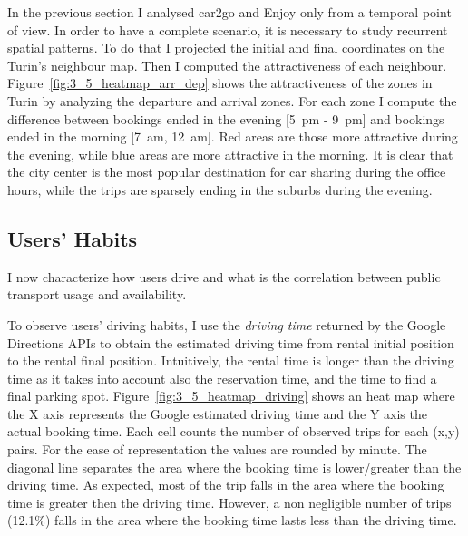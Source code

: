 In the previous section I analysed car2go and Enjoy only from a temporal point of view. In order to have a complete scenario, it is necessary to study recurrent spatial patterns. To do that I projected the initial and final coordinates on the Turin's neighbour map. Then I computed the attractiveness of each neighbour. Figure~\ref{fig:3_5_heatmap_arr_dep} shows the attractiveness of the  zones in Turin by analyzing the departure and arrival zones. For each zone I compute the difference between bookings ended in the evening [5~pm - 9~pm] and bookings ended in the morning [7~am, 12~am]. Red {areas are those} more attractive during the evening, while blue areas are more attractive in the morning. It is clear that the city center is the most popular destination for car sharing during the office hours, while the trips are sparsely ending in the suburbs during the evening.


\subsection{Users' Habits}

I now characterize how users drive and what is the correlation between public transport usage and availability.

To observe users' driving habits, I use the \textit{driving time} returned by the Google Directions APIs to {obtain} the estimated {driving} time from {rental initial position to the rental final position}. Intuitively, the {rental} time is longer than the driving time as it takes into account also the {reservation} time, and the time to find a final parking spot. Figure~\ref{fig:3_5_heatmap_driving} shows an heat map where the X axis represents the Google estimated driving time and the Y axis the actual booking time. Each cell counts the number of {observed} trips {for each (x,y) pairs}.
For the ease of representation the values are rounded by minute. The diagonal line separates the area where the booking time is lower/greater than the driving time. As expected, most of the trip falls in the area where the booking time is greater then the driving time. However, a non negligible number of trips (12.1\%) falls in the area where the booking time lasts less than the driving time. 



